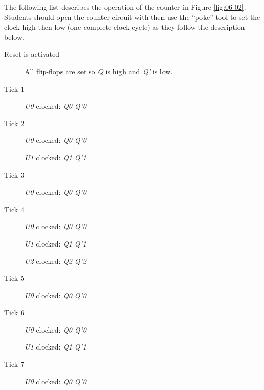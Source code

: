 The following list describes the operation of the counter in Figure \ref{fig:06-02}. Students should open the counter circuit with \LE then use the ``poke'' tool to set the clock high then low (one complete clock cycle) as they follow the description below.

\begin{description}
	\item [Reset is activated] All flip-flops are set so \textit{Q} is high and \textit{Q'} is low.
	
	\item [Tick 1] \textit{U0} clocked: \textit{Q0} \textdownarrow \: \textemdash \: \textit{Q'0} \textuparrow

	\item [Tick 2] \textit{U0} clocked: \textit{Q0} \textuparrow \: \textemdash \: \textit{Q'0} \textdownarrow
	
	\hspace{14pt}\textit{U1} clocked: \textit{Q1} \textdownarrow \: \textemdash \: \textit{Q'1} \textuparrow
	
	\item [Tick 3] \textit{U0} clocked: \textit{Q0} \textdownarrow \: \textemdash \: \textit{Q'0} \textuparrow

	\item [Tick 4] \textit{U0} clocked: \textit{Q0} \textuparrow \: \textemdash \: \textit{Q'0} \textdownarrow
	
	\hspace{14pt}\textit{U1} clocked: \textit{Q1} \textuparrow \: \textemdash \: \textit{Q'1} \textdownarrow
	
	\hspace{14pt}\textit{U2} clocked: \textit{Q2} \textdownarrow \: \textemdash \: \textit{Q'2} \textuparrow

	\item [Tick 5] \textit{U0} clocked: \textit{Q0} \textdownarrow \: \textemdash \: \textit{Q'0} \textuparrow

	\item [Tick 6] \textit{U0} clocked: \textit{Q0} \textuparrow \: \textemdash \: \textit{Q'0} \textdownarrow
	
	\hspace{14pt}\textit{U1} clocked: \textit{Q1} \textdownarrow \: \textemdash \: \textit{Q'1} \textuparrow

	\item [Tick 7] \textit{U0} clocked: \textit{Q0} \textdownarrow \: \textemdash \: \textit{Q'0} \textuparrow


\end{description}

